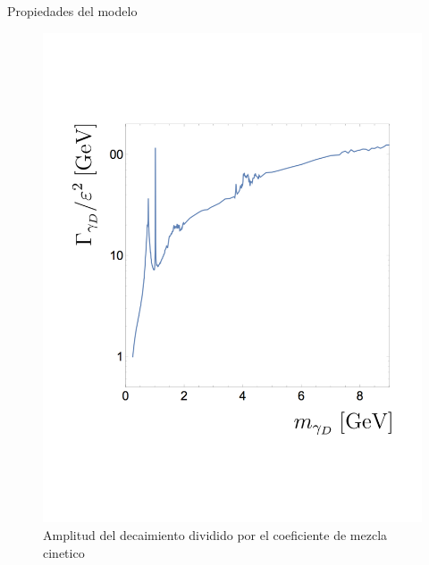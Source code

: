 \begin{frame}{Propiedades del modelo}
\begin{figure}[ht]
\begin{minipage}[b]{0.45\linewidth}
            \includegraphics[width=\textwidth]{figures_intro_GammaD_Width_over_e2_GeV_upto9GeV_updatedTitles.pdf}
            \caption{Amplitud del decaimiento dividido por el coeficiente de mezcla cinetico}
            \label{fig:b}
        \end{minipage}
    \end{figure}

\end{frame}

